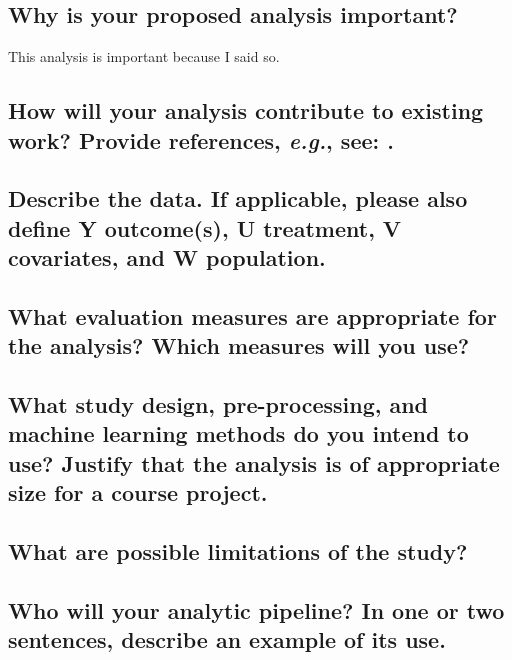 \documentclass[twoside,11pt]{article}
\begin{document}
\subsection{Why is your proposed analysis important?}
This analysis is important because I said so. 

\subsection{How will your analysis contribute to existing work? Provide references, \emph{e.g.}, see: \cite{cite1}.}


\subsection{Describe the data. If applicable, please also define Y outcome(s), U treatment, V covariates, and W population.}


\subsection{What evaluation measures are appropriate for the analysis? Which measures will you use?}


\subsection{What study design, pre-processing, and machine learning methods do you intend to use? Justify that the analysis is of appropriate size for a course project.}


\subsection{What are possible limitations of the study?}

\subsection{Who will your analytic pipeline? In one or two sentences, describe an example of its use.}


\end{document}
